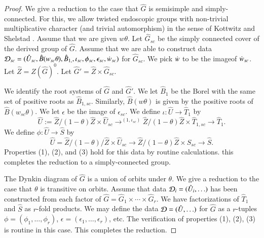 \begin{proof}
  We give a reduction to the case that $\hat G$ is semisimple and
  simply-connected.  For this, we allow twisted endoscopic groups with
  non-trivial multiplicative character (and trivial automorphism) in
  the sense of Kottwitz and Shelstad \cite{kottwitz1999foundations}.
  Assume that we are given $w\theta$.  Let $\hat G_{sc}$ be
  the simply connected cover of the derived group of $\hat G$.  Assume
  that we are able to construct data $\mathcal D_{sc}=(\hat U_{sc},\hat
  B(w_{sc}\theta),\hat
  B_{1,\sc},\iota_{sc},\phi_{sc},\epsilon_{sc},\dot w_{sc})$ for $\hat
  G_{sc}$.  
  We pick $\dot w$ to be the imageof $\dot w_{sc}$.  Let
  $\hat Z = Z(\hat G)^0$.  Let $\hat G' = \hat Z\times \hat G_{sc}$.


  We identify the root systems of $\hat G$ and $\hat G'$.  We let
  $\hat B_1$ be the Borel with the same set of positive roots as $\hat
  B_{1,sc}$.  Similarly, $\hat B(w\theta)$ is given by the positive
  roots of $\hat B(w_{sc}\theta)$.  We let $\epsilon$ be the image of
  $\epsilon_{sc}$.  We define $\iota:\hat U\to \hat T_1$ by
  \[
  \hat U := \hat Z/(1-\theta)\hat Z \times \hat U_{sc} \to^{(1,\iota_{sc})}
\hat Z/(1-\theta)\hat Z\times \hat T_{1,sc} \to \hat T_1.
  \]
  We define $\phi:\hat U\to \hat S$ by
  \[
  \hat U = \hat Z/(1-\theta)/\hat Z \times \hat U_{sc}
\to \hat Z/(1-\theta)\hat Z \times 
  \hat S_{sc}\to \hat S.
  \]
  Properties (1), (2), and (3) hold for this data by routine calculations.
  this completes the reduction to a simply-connected group.

  The Dynkin diagram of $\hat G$ is a union of orbits under $\theta$.
  We give a reduction to the case that $\theta$ is transitive on
  orbits.  Assume that data $\mathcal D_i=(\hat U_i,\ldots)$ has been
  constructed from each factor of
  $\hat G = \hat G_1\times\cdots\times \hat G_r$.  We have
  factorizations of $\hat T_1$ and $\hat S$ as $r$-fold products.  We
  may define the data $\mathcal D=(\hat U,\ldots)$ for $\hat G$ as a
  $r$-tuples $\phi = (\phi_1,\ldots,\phi_r)$,
  $\epsilon = (\epsilon_{1},\ldots,\epsilon_{r})$, etc.  The
  verification of properties (1), (2), (3) is routine in this case.
  This completes the reduction.


\end{proof}
